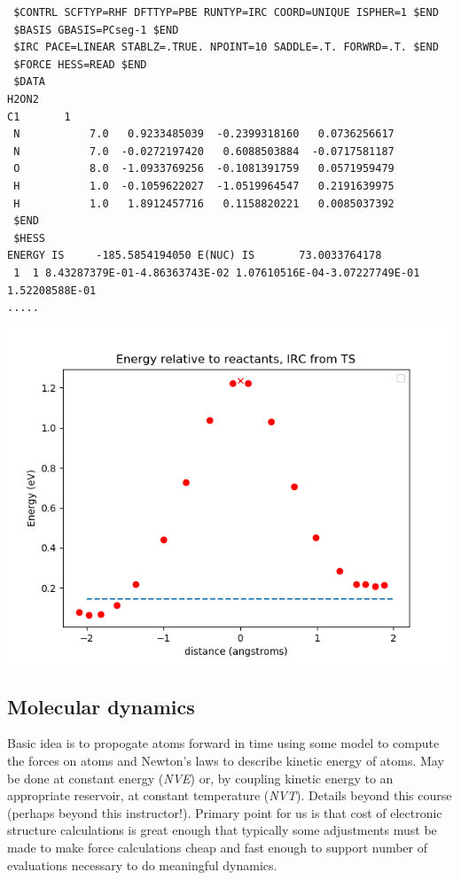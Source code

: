 \documentclass[11pt]{article}
\begin{document}
\begin{verbatim}
 $CONTRL SCFTYP=RHF DFTTYP=PBE RUNTYP=IRC COORD=UNIQUE ISPHER=1 $END
 $BASIS GBASIS=PCseg-1 $END
 $IRC PACE=LINEAR STABLZ=.TRUE. NPOINT=10 SADDLE=.T. FORWRD=.T. $END
 $FORCE HESS=READ $END
 $DATA
H2ON2                                                                           
C1       1
 N           7.0   0.9233485039  -0.2399318160   0.0736256617
 N           7.0  -0.0272197420   0.6088503884  -0.0717581187
 O           8.0  -1.0933769256  -0.1081391759   0.0571959479
 H           1.0  -0.1059622027  -1.0519964547   0.2191639975
 H           1.0   1.8912457716   0.1158820221   0.0085037392
 $END      
 $HESS
ENERGY IS     -185.5854194050 E(NUC) IS       73.0033764178
 1  1 8.43287379E-01-4.86363743E-02 1.07610516E-04-3.07227749E-01 1.52208588E-01
.....
\end{verbatim}

\begin{center}
\includegraphics[width=.9\linewidth]{./Images/IRC.png}
\end{center}

\subsection{Molecular dynamics}
\label{sec:orga2ec8ab}
Basic idea is to propogate atoms forward in time using some model to compute the forces on atoms and Newton's laws to describe kinetic energy of atoms.  May be done at constant energy (\emph{NVE}) or, by coupling kinetic energy to an appropriate reservoir, at constant temperature (\emph{NVT}).  Details beyond this course (perhaps beyond this instructor!).  Primary point for us is that cost of electronic structure calculations is great enough that typically some adjustments must be made to make force calculations cheap and fast enough to support number of evaluations necessary to do meaningful dynamics.
\end{document}

